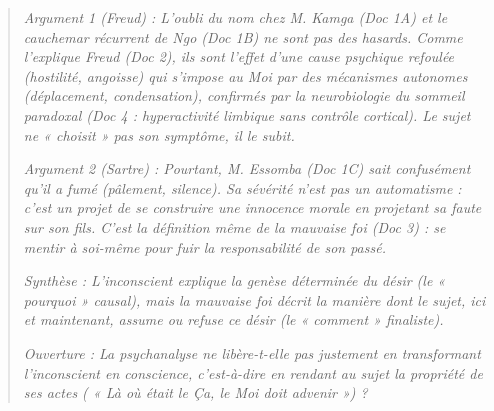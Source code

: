 \documentclass[11pt]{article}
\begin{document}
\begin{exoresolu}
\begin{quote}
\emph{Argument 1 (Freud) : L'oubli du nom chez M. Kamga (Doc 1A) et le cauchemar récurrent de Ngo (Doc 1B) ne sont pas des hasards. Comme l'explique Freud (Doc 2), ils sont l'effet d'une cause psychique refoulée (hostilité, angoisse) qui s'impose au Moi par des mécanismes autonomes (déplacement, condensation), confirmés par la neurobiologie du sommeil paradoxal (Doc 4 : hyperactivité limbique sans contrôle cortical). Le sujet ne « choisit » pas son symptôme, il le subit.}

\emph{Argument 2 (Sartre) : Pourtant, M. Essomba (Doc 1C) \emph{sait} confusément qu'il a fumé (pâlement, silence). Sa sévérité n'est pas un automatisme : c'est un \emph{projet} de se construire une innocence morale en projetant sa faute sur son fils. C'est la définition même de la mauvaise foi (Doc 3) : se mentir à soi-même pour fuir la responsabilité de son passé.}

\emph{Synthèse : L'inconscient explique la \emph{genèse} déterminée du désir (le « pourquoi » causal), mais la mauvaise foi décrit la \emph{manière} dont le sujet, ici et maintenant, \emph{assume} ou \emph{refuse} ce désir (le « comment » finaliste).}

\emph{Ouverture : La psychanalyse ne libère-t-elle pas justement en transformant l'inconscient en conscience, c'est-à-dire en rendant au sujet la propriété de ses actes ( « Là où était le Ça, le Moi doit advenir ») ?}
\end{quote}
\end{exoresolu}
\end{document}
